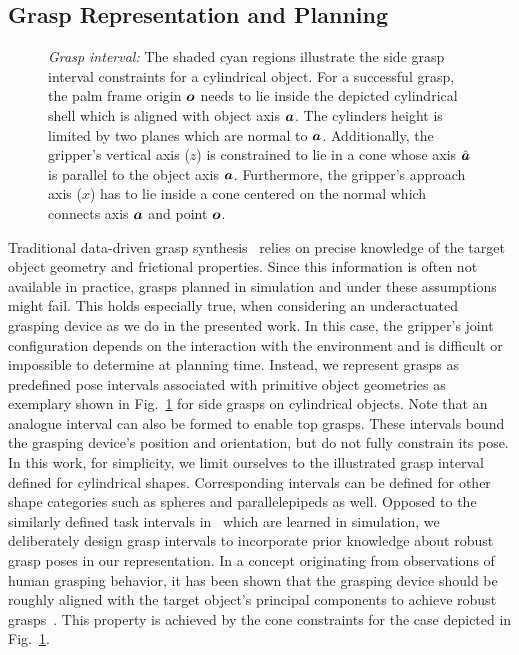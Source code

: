 \subsection{Grasp Representation and Planning}
\label{subsec:grasp_planning}
%
\begin{figure}[t!] 
   \centering
     
    \caption{\textit{Grasp interval:} The shaded cyan regions illustrate the side grasp interval
      constraints for a cylindrical object. For a successful grasp, the palm frame origin $\mbox{\boldmath $o$}$
      needs to lie inside the depicted cylindrical shell which is aligned with object axis
      $\mbox{\boldmath $a$}$. The cylinders height is limited by two planes which are normal to
      $\mbox{\boldmath $a$}$. Additionally, the gripper's vertical axis ($z$) is constrained to lie in a cone
      whose axis $\hat{\mbox{\boldmath $a$}}$ is parallel to the object axis $\mbox{\boldmath $a$}$. Furthermore, the
      gripper's approach axis ($x$) has to lie inside a cone centered on the normal which connects
      axis $\mbox{\boldmath $a$}$ and point $\mbox{\boldmath $o$}$.}
   \label{fig:grasp_interval}
   \vspace{-0.5cm}
\end{figure}
%
Traditional data-driven grasp synthesis~\cite{Bohg14} relies on precise knowledge of the target
object geometry and frictional properties. Since this information is often not available in
practice, grasps planned in simulation and under these assumptions might fail. This holds especially
true, when considering an underactuated grasping device as we do in the presented work. In this
case, the gripper's joint configuration depends on the interaction with the environment and is
difficult or impossible to determine at planning time. Instead, we represent grasps as predefined
pose intervals associated with primitive object geometries as exemplary shown in
Fig.~\ref{fig:grasp_interval} for side grasps on cylindrical objects. Note that an analogue interval
can also be formed to enable top grasps. These intervals bound the grasping device's position and
orientation, but do not fully constrain its pose. In this work, for simplicity, we limit ourselves
to the illustrated grasp interval defined for cylindrical shapes. Corresponding intervals can be
defined for other shape categories such as spheres and parallelepipeds as well. Opposed to the
similarly defined task intervals in~\cite{Gien08a, Gien08b} which are learned in simulation, we
deliberately design grasp intervals to incorporate prior knowledge about robust grasp poses in our
representation. In a concept originating from observations of human grasping behavior, it has been
shown that the grasping device should be roughly aligned with the target object's principal
components to achieve robust grasps~\cite{Bala12}. This property is achieved by the cone constraints
for the case depicted in Fig.~\ref{fig:grasp_interval}.

